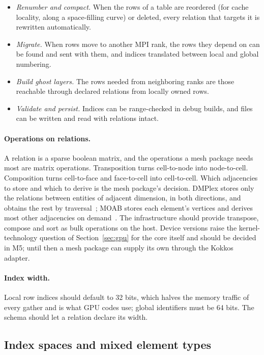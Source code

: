 \documentclass[11pt,a4paper]{article}
\begin{document}
\begin{itemize}
  \item \emph{Renumber and compact.}  When the rows of a table are reordered
        (for cache locality, along a space-filling curve) or deleted, every
        relation that targets it is rewritten automatically.
  \item \emph{Migrate.}  When rows move to another MPI rank, the rows they
        depend on can be found and sent with them, and indices translated
        between local and global numbering.
  \item \emph{Build ghost layers.}  The rows needed from neighboring ranks
        are those reachable through declared relations from locally owned
        rows.
  \item \emph{Validate and persist.}  Indices can be range-checked in debug
        builds, and files can be written and read with relations intact.
\end{itemize}

\paragraph{Operations on relations.}  A relation is a sparse boolean matrix,
and the operations a mesh package needs most are matrix operations.
Transposition turns cell-to-node into node-to-cell.  Composition turns
cell-to-face and face-to-cell into cell-to-cell.  Which adjacencies to store
and which to derive is the mesh package's decision.  DMPlex stores only the
relations between entities of adjacent dimension, in both directions, and
obtains the rest by traversal~\cite{dmplex}; MOAB stores each element's
vertices and derives most other adjacencies on demand~\cite{moab}.  The
infrastructure should provide transpose,
compose and sort as bulk operations on the host.  Device versions raise the
kernel-technology question of Section~\ref{sec:gpu} for the core itself and
should be decided in M5; until then a mesh package can supply its own through
the Kokkos adapter.

\paragraph{Index width.}  Local row indices should default to 32 bits, which
halves the memory traffic of every gather and is what GPU codes use; global
identifiers must be 64 bits.  The schema should let a relation declare its
width.

\subsection{Index spaces and mixed element types}
\end{document}
